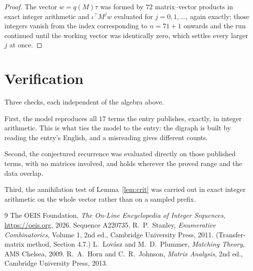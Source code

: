\documentclass[11pt,a4paper]{article}
\theoremstyle{plain}
\theoremstyle{definition}
\begin{document}
\begin{proof}
The vector $w=q(M)\tau$ was formed by $72$ matrix--vector products in exact integer
arithmetic and $\iota^{\!\top}M^{j}w$ evaluated for $j=0,1,\dots$, again exactly; those
integers vanish from the index corresponding to $n=71+1$ onwards and the run continued
until the working vector was identically zero, which settles every larger $j$ at once.
\end{proof}

\section{Verification}

Three checks, each independent of the algebra above.

First, the model reproduces all $17$ terms the entry publishes, exactly, in integer
arithmetic. This is what ties the model to the entry: the digraph is built by reading the
entry's English, and a misreading gives different counts.

Second, the conjectured recurrence was evaluated directly on those published terms, with no
matrices involved, and holds wherever the proved range and the data overlap.

Third, the annihilation test of Lemma~\ref{lem:crit} was carried out in exact integer
arithmetic on the whole vector rather than on a sampled prefix.

\begin{thebibliography}{9}
 The OEIS Foundation, \emph{The On-Line Encyclopedia of Integer
Sequences}, \url{https://oeis.org}, 2026. Sequence A220735.
 R.~P.~Stanley, \emph{Enumerative Combinatorics}, Volume 1, 2nd ed.,
Cambridge University Press, 2011. (Transfer-matrix method, Section 4.7.)
 L.~Lov\'asz and M.~D.~Plummer, \emph{Matching Theory}, AMS Chelsea,
2009.
 R.~A.~Horn and C.~R.~Johnson, \emph{Matrix Analysis}, 2nd ed., Cambridge
University Press, 2013.
\end{thebibliography}
\end{document}
